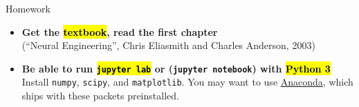\documentclass[handout,aspectratio=169]{beamer}
\begin{document}
\begin{frame}{Homework}
	\begin{itemize}
		\setlength{\itemsep}{0.5cm}
		\item \textbf{Get the \hl{textbook}, read the first chapter}\\
		(\enquote{Neural Engineering}, Chris Eliasmith and Charles Anderson, 2003)
		\item \textbf{Be able to run \hl{\texttt{jupyter lab}} or (\texttt{jupyter notebook}) with \hl{Python 3}}\\
		Install \texttt{numpy}, \texttt{scipy}, and \texttt{matplotlib}. You may want to use \href{https://www.anaconda.com/distribution/}{Anaconda}, which ships with these packets preinstalled.
	\end{itemize}
\end{frame}
\end{document}
